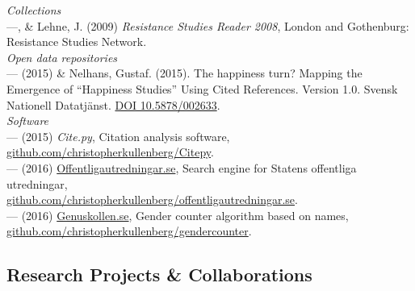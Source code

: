 \documentclass[a4paper,11pt,oneside]{article}
\begin{document}
    \noindent \emph{Collections}\\
      ---, \& Lehne, J. (2009) \emph{Resistance Studies Reader 2008}, London and Gothenburg: Resistance Studies Network.\\

    \noindent \emph{Open data repositories}\\
    --- (2015) \& Nelhans, Gustaf. (2015). The happiness turn? Mapping the
    Emergence of “Happiness Studies” Using Cited References. Version 1.0. Svensk
    Nationell Datatjänst. \href{http://dx.doi.org/10.5878/002633}{DOI 10.5878/002633}.
    \\

    \noindent \emph{Software}\\
    --- (2015) \emph{Cite.py}, Citation analysis software, \href{https://github.com/christopherkullenberg/Citepy}{github.com/christopherkullenberg/Citepy}.\\
    --- (2016) \href{http://offentligautredningar.se}{Offentligautredningar.se}, Search engine for Statens offentliga utredningar,\\ \href{https://github.com/christopherkullenberg/offentligautredningar.se}{github.com/christopherkullenberg/offentligautredningar.se}. \\
    --- (2016) \href{https://genuskollen.se}{Genuskollen.se}, Gender counter algorithm based on names,\\ \href{https://github.com/christopherkullenberg/gendercounter}{github.com/christopherkullenberg/gendercounter}. \\



\subsection{Research Projects \& Collaborations}
\end{document}
